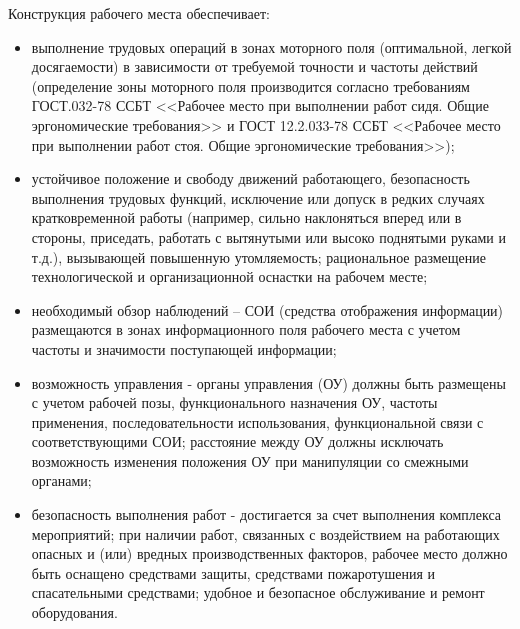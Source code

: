         Конструкция рабочего места обеспечивает:
        \begin{itemize}
            \item выполнение трудовых операций в зонах моторного поля
                (оптимальной, легкой досягаемости) в зависимости от требуемой
                точности и частоты действий (определение зоны моторного поля
                производится согласно требованиям\\ ГОСТ.032-78 ССБТ
                <<Рабочее место при выполнении работ сидя. Общие эргономические
                требования>> и ГОСТ 12.2.033-78 ССБТ <<Рабочее место при
                выполнении работ стоя.  Общие эргономические требования>>);
            \item устойчивое положение и свободу движений работающего,
                безопасность выполнения трудовых функций, исключение или допуск
                в редких случаях кратковременной работы (например, сильно
                наклоняться вперед или в стороны, приседать, работать с
                вытянутыми или высоко поднятыми руками и т.д.), вызывающей
                повышенную утомляемость; рациональное размещение
                технологической и  организационной оснастки на рабочем месте;
            \item необходимый обзор наблюдений – СОИ (средства отображения
                информации) размещаются в зонах информационного поля рабочего
                места с учетом частоты и значимости поступающей информации;
            \item возможность управления - органы управления (ОУ) должны быть
                размещены с учетом рабочей позы, функционального назначения ОУ,
                частоты применения, последовательности использования,
                функциональной связи с соответствующими СОИ; расстояние между
                ОУ должны исключать возможность изменения положения ОУ при
                манипуляции со смежными органами;
            \item безопасность выполнения работ - достигается за счет
                выполнения комплекса мероприятий; при наличии работ, связанных
                с воздействием на работающих опасных и (или) вредных
                производственных факторов, рабочее место должно быть оснащено
                средствами защиты, средствами пожаротушения и спасательными
                средствами; удобное и безопасное обслуживание и ремонт
                оборудования.
        \end{itemize}

